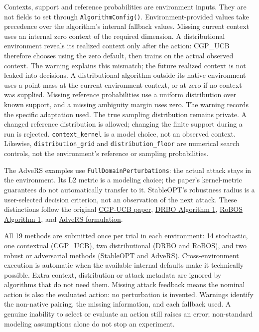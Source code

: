 \documentclass[10pt,a4paper]{article}
\begin{document}
Contexts,\allowbreak{} support and reference probabilities are environment inputs. They are not fields to set through \texttt{Algorithm\allowbreak{}Config()}. Environment-provided values take precedence over the algorithm's internal fallback values. Missing current context uses an internal zero context of the required dimension. A distributional environment reveals its realized context only after the action: CGP\_\allowbreak{}UCB therefore chooses using the zero default,\allowbreak{} then trains on the actual observed context. The warning explains this mismatch; the future realized context is not leaked into decisions. A distributional algorithm outside its native environment uses a point mass at the current environment context,\allowbreak{} or at zero if no context was supplied. Missing reference probabilities use a uniform distribution over known support,\allowbreak{} and a missing ambiguity margin uses zero. The warning records the specific adaptation used. The true sampling distribution remains private. A changed reference distribution is allowed; changing the finite support during a run is rejected. \texttt{context\_\allowbreak{}kernel} is a model choice,\allowbreak{} not an observed context. Likewise,\allowbreak{} \texttt{distribution\_\allowbreak{}grid} and \texttt{distribution\_\allowbreak{}floor} are numerical search controls,\allowbreak{} not the environment's reference or sampling probabilities.


The AdveRS examples use \texttt{Full\allowbreak{}Domain\allowbreak{}Perturbations}: the actual attack stays in the environment. Its L2 metric is a modeling choice; the paper's kernel-metric guarantees do not automatically transfer to it. StableOPT's robustness radius is a user-selected decision criterion,\allowbreak{} not an observation of the next attack. These distinctions follow the original \href{https://papers.neurips.cc/paper/4487-contextual-gaussian-process-bandit-optimization.pdf}{CGP-UCB paper},\allowbreak{} \href{https://proceedings.mlr.press/v108/kirschner20a/kirschner20a.pdf}{DRBO Algorithm 1},\allowbreak{} \href{https://proceedings.neurips.cc/paper_files/paper/2023/file/daa098aa8e1fc718943ff1ab7b5b30c9-Paper-Conference.pdf}{RoBOS Algorithm 1},\allowbreak{} and \href{https://proceedings.neurips.cc/paper_files/paper/2025/file/4830a9b95a2f63fc4b3fe09abc18f045-Paper-Conference.pdf}{AdveRS formulation}.


All 19 methods are submitted once per trial in each environment: 14 stochastic,\allowbreak{} one contextual (CGP\_\allowbreak{}UCB),\allowbreak{} two distributional (DRBO and RoBOS),\allowbreak{} and two robust or adversarial methods (StableOPT and AdveRS). Cross-environment execution is automatic when the available internal defaults make it technically possible. Extra context,\allowbreak{} distribution or attack metadata are ignored by algorithms that do not need them. Missing attack feedback means the nominal action is also the evaluated action: no perturbation is invented. Warnings identify the non-native pairing,\allowbreak{} the missing information,\allowbreak{} and each fallback used. A genuine inability to select or evaluate an action still raises an error; non-standard modeling assumptions alone do not stop an experiment.
\end{document}
